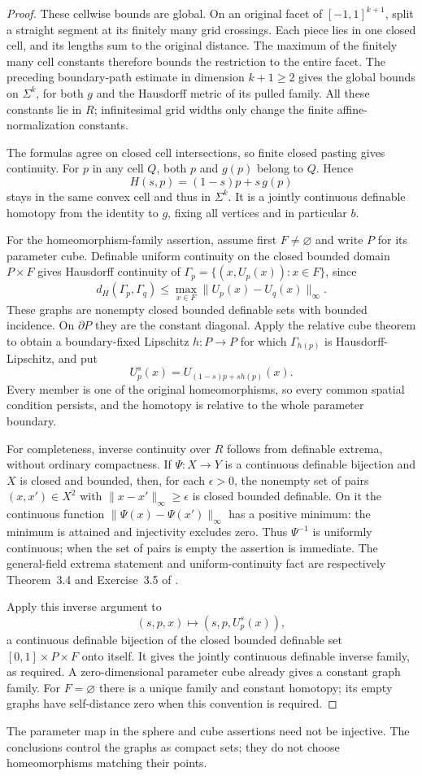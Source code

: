 \begin{proof}
These cellwise bounds are global.  On an original facet
of $[-1,1]^{k+1}$, split a straight segment at its finitely
many grid crossings.  Each piece lies in one closed
cell, and its lengths sum to the original distance.
The maximum of the finitely many cell constants therefore
bounds the restriction to the entire facet.  The preceding
boundary-path estimate in dimension $k+1\ge2$ gives the
global bounds on $\Sigma^k$, for both $g$ and the
Hausdorff metric of its pulled family.
All these constants lie in $R$; infinitesimal grid widths
only change the finite affine-normalization constants.

The formulas agree on closed cell intersections, so
finite closed pasting gives continuity.  For $p$ in
any cell $Q$, both $p$ and $g(p)$ belong to $Q$.  Hence
\[
 H(s,p)=(1-s)p+s\,g(p)
\]
stays in the same convex cell and thus in $\Sigma^k$.
It is a jointly continuous definable homotopy from the
identity to $g$, fixing all vertices and in particular $b$.

For the homeomorphism-family assertion, assume first
$F\ne\varnothing$ and write $P$ for its parameter cube.
Definable uniform continuity on the closed bounded
domain $P\times F$ gives Hausdorff continuity of
$\Gamma_p=\{(x,U_p(x)):x\in F\}$, since
\[
 d_H(\Gamma_p,\Gamma_q)
 \le \max_{x\in F}\|U_p(x)-U_q(x)\|_\infty.
\]
These graphs are nonempty closed bounded definable sets
with bounded incidence.  On $\partial P$ they are the
constant diagonal.  Apply the relative cube theorem to
obtain a boundary-fixed Lipschitz $h:P\to P$ for which
$\Gamma_{h(p)}$ is Hausdorff-Lipschitz, and put
\[
 U^s_p(x)=U_{(1-s)p+s h(p)}(x).
\]
Every member is one of the original homeomorphisms,
so every common spatial condition persists, and the
homotopy is relative to the whole parameter boundary.

For completeness, inverse continuity over $R$ follows
from definable extrema, without ordinary compactness.
If $\Psi:X\to Y$ is a continuous definable bijection and
$X$ is closed and bounded, then, for each $\epsilon>0$,
the nonempty set of pairs $(x,x')\in X^2$ with
$\|x-x'\|_\infty\ge\epsilon$ is closed bounded definable.
On it the continuous function
$\|\Psi(x)-\Psi(x')\|_\infty$ has a positive minimum:
the minimum is attained and injectivity excludes zero.
Thus $\Psi^{-1}$ is uniformly continuous; when the
set of pairs is empty the assertion is immediate.
The general-field extrema statement and uniform-continuity
fact are respectively Theorem~3.4 and Exercise~3.5 of
\cite[pp.~26--27; field convention pp.~9--10]{Coste1999}.

Apply this inverse argument to
\[
 (s,p,x)\longmapsto(s,p,U^s_p(x)),
\]
a continuous definable bijection of the closed bounded
definable set $[0,1]\times P\times F$ onto itself.
It gives the jointly continuous definable inverse
family, as required.  A zero-dimensional parameter
cube already gives a constant graph family.
For $F=\varnothing$ there is a unique family and
constant homotopy; its empty graphs have self-distance
zero when this convention is required.
\end{proof}

The parameter map in the sphere and cube assertions need not be
injective.  The conclusions control the graphs as compact sets;
they do not choose homeomorphisms matching their points.
